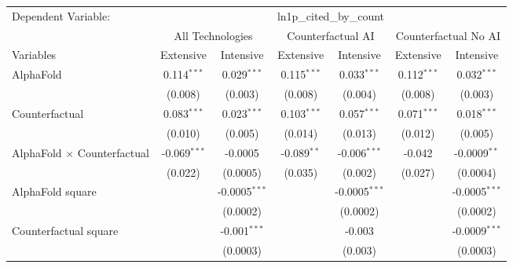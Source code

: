 \begingroup
\centering
\begin{tabular}{lcccccc}
   \tabularnewline \midrule \midrule
   Dependent Variable: & \multicolumn{6}{c}{ln1p\_cited\_by\_count}\\
 & \multicolumn{2}{c}{All Technologies} & \multicolumn{2}{c}{Counterfactual AI} & \multicolumn{2}{c}{Counterfactual No AI} \\
\cmidrule(lr){1-1}\cmidrule(lr){2-3} \cmidrule(lr){4-5} \cmidrule(lr){6-7}
Variables & \multicolumn{1}{c}{Extensive} & \multicolumn{1}{c}{Intensive} & \multicolumn{1}{c}{Extensive} & \multicolumn{1}{c}{Intensive} & \multicolumn{1}{c}{Extensive} & \multicolumn{1}{c}{Intensive} \\
\cmidrule(lr){1-1}\cmidrule(lr){2-2} \cmidrule(lr){3-3} \cmidrule(lr){4-4} \cmidrule(lr){5-5} \cmidrule(lr){6-6} \cmidrule(lr){7-7}
   AlphaFold                          & 0.114$^{***}$  & 0.029$^{***}$     & 0.115$^{***}$ & 0.033$^{***}$    & 0.112$^{***}$ & 0.032$^{***}$\\   
                                      & (0.008)        & (0.003)           & (0.008)       & (0.004)          & (0.008)       & (0.003)\\   
   Counterfactual                     & 0.083$^{***}$  & 0.023$^{***}$     & 0.103$^{***}$ & 0.057$^{***}$    & 0.071$^{***}$ & 0.018$^{***}$\\   
                                      & (0.010)        & (0.005)           & (0.014)       & (0.013)          & (0.012)       & (0.005)\\   
   AlphaFold $\times$ Counterfactual  & -0.069$^{***}$ & -0.0005           & -0.089$^{**}$ & -0.006$^{***}$   & -0.042        & -0.0009$^{**}$\\   
                                      & (0.022)        & (0.0005)          & (0.035)       & (0.002)          & (0.027)       & (0.0004)\\   
   AlphaFold square                   &                & -0.0005$^{***}$   &               & -0.0005$^{***}$  &               & -0.0005$^{***}$\\   
                                      &                & (0.0002)          &               & (0.0002)         &               & (0.0002)\\   
   Counterfactual square              &                & -0.001$^{***}$    &               & -0.003           &               & -0.0009$^{***}$\\   
                                      &                & (0.0003)          &               & (0.003)          &               & (0.0003)\\   

\end{tabular}
